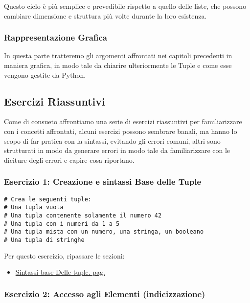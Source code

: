 Questo ciclo è più semplice e prevedibile rispetto a quello delle liste, che possono cambiare dimensione e struttura più volte durante la loro esistenza.


\newpage

\subsubsection{Rappresentazione Grafica}

In questa parte tratteremo gli argomenti affrontati nei capitoli precedenti in maniera grafica, in modo tale da chiarire ulteriormente le Tuple e come esse vengono gestite da Python.





\subsection{Esercizi Riassuntivi}
Come di consueto affrontiamo una serie di esercizi riassuntivi per familiarizzare con i concetti affrontati, alcuni esercizi possono sembrare banali, ma hanno lo scopo di far pratica con la sintassi, evitando gli errori comuni, altri sono strutturati in modo da generare errori in modo tale da familiarizzare con le diciture degli errori e capire cosa riportano.




\subsubsection{Esercizio 1: Creazione e sintassi Base delle Tuple}\label{Esercizio1Tuple}


\begin{lstlisting}
# Crea le seguenti tuple:
# Una tupla vuota
# Una tupla contenente solamente il numero 42
# Una tupla con i numeri da 1 a 5
# Una tupla mista con un numero, una stringa, un booleano
# Una tupla di stringhe
\end{lstlisting}

Per questo esercizio, ripassare le sezioni:
\begin{itemize}
    \item \hyperref[SintassiTuple]{Sintassi base Delle tuple. pag.\pageref{SintassiTuple}}
\end{itemize}


\subsubsection{Esercizio 2: Accesso agli Elementi (indicizzazione)}\label{Esercizio2Tuple}


